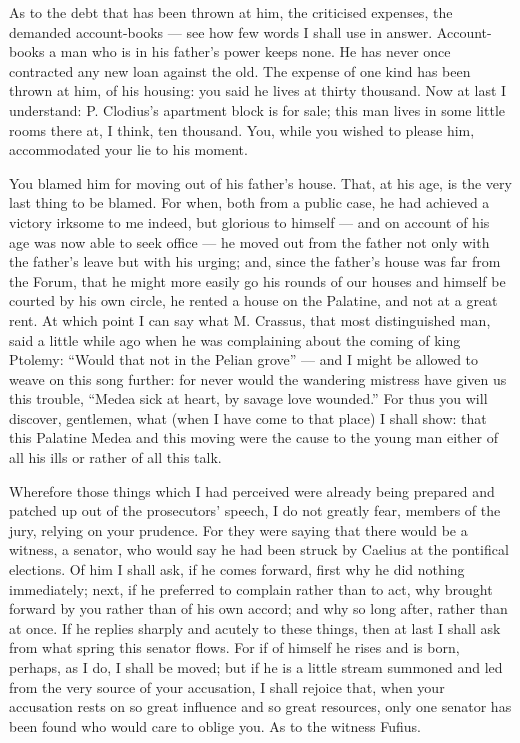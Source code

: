  As to the debt that has been thrown at him, the criticised expenses, the demanded account-books --- see how few words I shall use in answer. Account-books a man who is in his father's power keeps none. He has never once contracted any new loan against the old. The expense of one kind has been thrown at him, of his housing: you said he lives at thirty thousand. Now at last I understand: P. Clodius's apartment block is for sale; this man lives in some little rooms there at, I think, ten thousand. You, while you wished to please him, accommodated your lie to his moment.

 You blamed him for moving out of his father's house. That, at his age, is the very last thing to be blamed. For when, both from a public case, he had achieved a victory irksome to me indeed, but glorious to himself --- and on account of his age was now able to seek office --- he moved out from the father not only with the father's leave but with his urging; and, since the father's house was far from the Forum, that he might more easily go his rounds of our houses and himself be courted by his own circle, he rented a house on the Palatine, and not at a great rent. At which point I can say what M. Crassus, that most distinguished man, said a little while ago when he was complaining about the coming of king Ptolemy: ``Would that not in the Pelian grove'' --- and I might be allowed to weave on this song further: for never would the wandering mistress have given us this trouble, ``Medea sick at heart, by savage love wounded.'' For thus you will discover, gentlemen, what (when I have come to that place) I shall show: that this Palatine Medea and this moving were the cause to the young man either of all his ills or rather of all this talk.

 Wherefore those things which I had perceived were already being prepared and patched up out of the prosecutors' speech, I do not greatly fear, members of the jury, relying on your prudence. For they were saying that there would be a witness, a senator, who would say he had been struck by Caelius at the pontifical elections. Of him I shall ask, if he comes forward, first why he did nothing immediately; next, if he preferred to complain rather than to act, why brought forward by you rather than of his own accord; and why so long after, rather than at once. If he replies sharply and acutely to these things, then at last I shall ask from what spring this senator flows. For if of himself he rises and is born, perhaps, as I do, I shall be moved; but if he is a little stream summoned and led from the very source of your accusation, I shall rejoice that, when your accusation rests on so great influence and so great resources, only one senator has been found who would care to oblige you. As to the witness Fufius.

